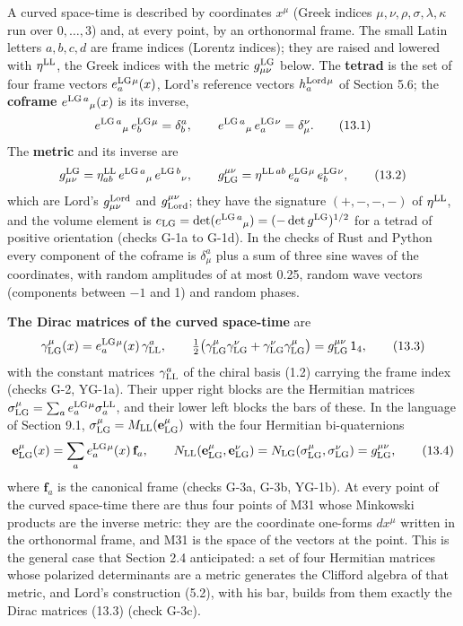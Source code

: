 \documentclass[
  10pt,
]{article}
\begin{document}
A curved space-time is described by coordinates \(x^\mu\) (Greek indices
\(\mu,\nu,\rho,\sigma,\lambda,\kappa\) run over \(0,\dots,3\)) and, at
every point, by an orthonormal frame. The small Latin letters
\(a,b,c,d\) are frame indices (Lorentz indices); they are raised and
lowered with \(\eta^{\rm LL}\), the Greek indices with the metric
\(g^{\rm LG}_{\mu\nu}\) below. The \textbf{tetrad} is the set of four
frame vectors \(e^{\rm LG}_a{}^\mu(x)\), Lord's reference vectors
\(h^{\rm Lord}_a{}^\mu\) of Section 5.6; the \textbf{coframe}
\(e^{{\rm LG}\,a}{}_\mu(x)\) is its inverse,
\[e^{{\rm LG}\,a}{}_\mu\,e^{\rm LG}_b{}^\mu=\delta^a_b,\qquad e^{{\rm LG}\,a}{}_\mu\,e^{\rm LG}_a{}^\nu=\delta^\nu_\mu.\tag{13.1}\]
The \textbf{metric} and its inverse are
\[g^{\rm LG}_{\mu\nu}=\eta^{\rm LL}_{ab}\,e^{{\rm LG}\,a}{}_\mu\,e^{{\rm LG}\,b}{}_\nu,\qquad g_{\rm LG}^{\mu\nu}=\eta^{{\rm LL}\,ab}\,e^{\rm LG}_a{}^\mu\,e^{\rm LG}_b{}^\nu,\tag{13.2}\]
which are Lord's \(g^{\rm Lord}_{\mu\nu}\) and
\(g_{\rm Lord}^{\mu\nu}\); they have the signature \((+,-,-,-)\) of
\(\eta^{\rm LL}\), and the volume element is
\(e_{\rm LG}=\det(e^{{\rm LG}\,a}{}_\mu)=(-\det g^{\rm LG})^{1/2}\) for
a tetrad of positive orientation (checks G-1a to G-1d). In the checks of
Rust and Python every component of the coframe is \(\delta^a_\mu\) plus
a sum of three sine waves of the coordinates, with random amplitudes of
at most 0.25, random wave vectors (components between \(-1\) and 1) and
random phases.

\textbf{The Dirac matrices of the curved space-time} are
\[\gamma^\mu_{\rm LG}(x)=e^{\rm LG}_a{}^\mu(x)\,\gamma^a_{\rm LL},\qquad\tfrac12\big(\gamma^\mu_{\rm LG}\gamma^\nu_{\rm LG}+\gamma^\nu_{\rm LG}\gamma^\mu_{\rm LG}\big)=g_{\rm LG}^{\mu\nu}\,\mathsf 1_4,\tag{13.3}\]
with the constant matrices \(\gamma^a_{\rm LL}\) of the chiral basis
(1.2) carrying the frame index (checks G-2, YG-1a). Their upper right
blocks are the Hermitian matrices
\(\sigma^\mu_{\rm LG}=\sum_ae^{\rm LG}_a{}^\mu\sigma^{\rm LL}_a\), and
their lower left blocks the bars of these. In the language of Section
9.1, \(\sigma^\mu_{\rm LG}=M_{\rm LL}(\mathbf e^\mu_{\rm LG})\) with the
four Hermitian bi-quaternions
\[\mathbf e^\mu_{\rm LG}(x)=\sum_ae^{\rm LG}_a{}^\mu(x)\,\mathbf f_a,\qquad N_{\rm LL}(\mathbf e^\mu_{\rm LG},\mathbf e^\nu_{\rm LG})=N_{\rm LG}(\sigma^\mu_{\rm LG},\sigma^\nu_{\rm LG})=g_{\rm LG}^{\mu\nu},\tag{13.4}\]
where \(\mathbf f_a\) is the canonical frame (checks G-3a, G-3b, YG-1b).
At every point of the curved space-time there are thus four points of
M31 whose Minkowski products are the inverse metric: they are the
coordinate one-forms \(dx^\mu\) written in the orthonormal frame, and
M31 is the space of the vectors at the point. This is the general case
that Section 2.4 anticipated: a set of four Hermitian matrices whose
polarized determinants are a metric generates the Clifford algebra of
that metric, and Lord's construction (5.2), with his bar, builds from
them exactly the Dirac matrices (13.3) (check G-3c).
\end{document}
